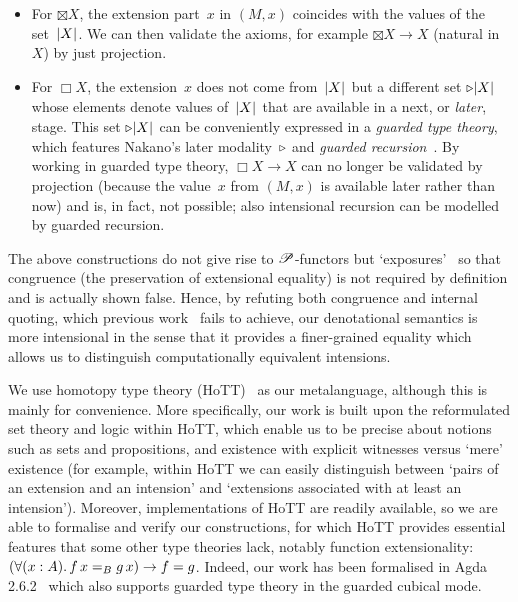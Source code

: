 \documentclass[a4paper,UKenglish,numberwithinsect,cleveref,thm-restate,draft]{lipics-v2021}
\numberwithin{equation}{section}
\theoremstyle{definition}
\theoremstyle{plain}
\begin{document}
\begin{itemize}
    \item For $\boxtimes X$, the extension part~$x$ in $(M, x)$ coincides with the values of the set~$\mathopen{}\left|X\right|_{}^{}\mathclose{}$.
    We can then validate the \SFour axioms, for example $\boxtimes X \to X$ (natural in~$X$) by just projection.
    
    \item For $\Box X$, the extension~$x$ does not come from~$\mathopen{}\left|X\right|_{}^{}\mathclose{}$ but a different set $\mathord{\triangleright} \mathopen{}\left|X\right|_{}^{}\mathclose{}$ whose elements denote values of~$\mathopen{}\left|X\right|_{}^{}\mathclose{}$ that are available in a next, or \emph{later}, stage.
    This set $\mathord{\triangleright} \mathopen{}\left|X\right|_{}^{}\mathclose{}$ can be conveniently expressed in a \emph{guarded type theory}, which features Nakano's later modality~$\mathord{\triangleright}$ and \emph{guarded recursion}~\cite{Nakano2000}.
    By working in guarded type theory, $\Box X \to X$ can no longer be validated by projection (because the value~$x$ from $(M, x)$ is available later rather than now) and is, in fact, not possible; also intensional recursion can be modelled by guarded recursion.
\end{itemize}
The above constructions do not give rise to $\mathscr{P}$-functors but `exposures'~\cite{Kavvos2017b} so that congruence (the preservation of extensional equality) is not required by definition and is actually shown false.
Hence, by refuting both congruence and internal quoting, which previous work~\cite{Gabbay2013,Kavvos2017b} fails to achieve, our denotational semantics is more intensional in the sense that it provides a finer-grained equality which allows us to distinguish computationally equivalent intensions.%

We use homotopy type theory (HoTT)~\cite{hottbook} as our metalanguage, although this is mainly for convenience.
More specifically, our work is built upon the reformulated set theory and logic within HoTT, which enable us to be precise about notions such as sets and propositions, and existence with explicit witnesses versus `mere' existence (for example, within HoTT we can easily distinguish between `pairs of an extension and an intension' and `extensions associated with at least an intension').
Moreover, implementations of HoTT are readily available, so we are able to formalise and verify our constructions, for which HoTT provides essential features that some other type theories lack, notably function extensionality: $\left(\fall{x : A} f\,x =_B g\,x\right) \to f = g$.
Indeed, our work has been formalised in Agda 2.6.2~\cite{Agda} which also supports guarded type theory in the guarded cubical mode.
\end{document}
